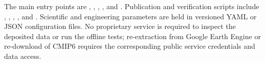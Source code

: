\documentclass[11pt,a4paper]{article}
\begin{document}
The main entry points are , , , ,  and . Publication and verification scripts include , , , ,  and . Scientific and engineering parameters are held in versioned YAML or JSON configuration files. No proprietary service is required to inspect the deposited data or run the offline tests; re-extraction from Google Earth Engine or re-download of CMIP6 requires the corresponding public service credentials and data access.
\end{document}
